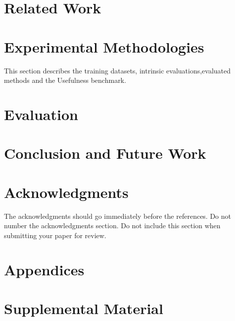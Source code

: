\documentclass[11pt,a4paper]{article}
\begin{document}
\section{Related Work}
\section{Experimental Methodologies}
This section describes the training datasets, intrinsic evaluations,evaluated methods and the Usefulness benchmark.
\section{Evaluation}
\section{Conclusion and Future Work}
\section*{Acknowledgments}

The acknowledgments should go immediately before the references. Do not number the acknowledgments section.
Do not include this section when submitting your paper for review.




\appendix

\section{Appendices}
\label{sec:appendix}

\section{Supplemental Material}
\label{sec:supplemental}
\end{document}
